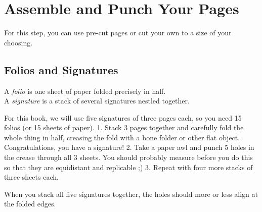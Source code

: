 \documentclass[
  openany]{book}
\begin{document}
\chapter{Assemble and Punch Your Pages}\label{assemble-and-punch-your-pages}

For this step, you can use pre-cut pages or cut your own to a size of your choosing.

\section{Folios and Signatures}\label{folios-and-signatures}

A \emph{folio} is one sheet of paper folded precisely in half.\\
A \emph{signature} is a stack of several signatures nestled together.

For this book, we will use five signatures of three pages each, so you need 15 folios (or 15 sheets of paper).
1. Stack 3 pages together and carefully fold the whole thing in half, creasing the fold with a bone folder or other flat object. Congratulations, you have a signature!
2. Take a paper awl and punch 5 holes in the crease through all 3 sheets. You should probably measure before you do this so that they are equidistant and replicable ;)
3. Repeat with four more stacks of three sheets each.

When you stack all five signatures together, the holes should more or less align at the folded edges.
\end{document}
